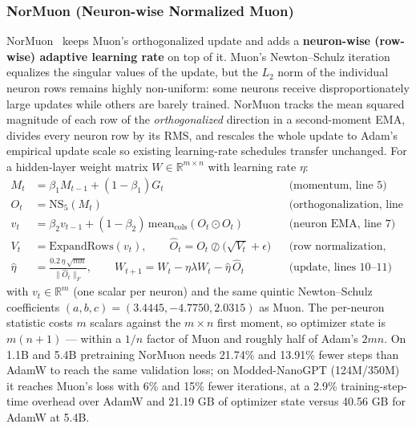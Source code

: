 \subsubsection{NorMuon (Neuron-wise Normalized Muon)}
NorMuon~\citep{li_normuon_2025} keeps Muon's orthogonalized update and adds a
\textbf{neuron-wise (row-wise) adaptive learning rate} on top of it. Muon's
Newton--Schulz iteration equalizes the singular values of the update, but the $L_2$ norm
of the individual neuron rows remains highly non-uniform: some neurons receive
disproportionately large updates while others are barely trained. NorMuon tracks the
mean squared magnitude of each row of the \emph{orthogonalized} direction in a
second-moment EMA, divides every neuron row by its RMS, and rescales the whole update to
Adam's empirical update scale so existing learning-rate schedules transfer unchanged.
For a hidden-layer weight matrix $W \in \mathbb{R}^{m \times n}$ with learning rate
$\eta$:
\begin{align}
M_t &= \beta_1 M_{t-1} + (1-\beta_1) G_t && \text{(momentum, line 5)} \\
O_t &= \mathrm{NS}_5(M_t) && \text{(orthogonalization, line 6)} \\
v_t &= \beta_2 v_{t-1} + (1-\beta_2)\,\mathrm{mean}_{\mathrm{cols}}(O_t \odot O_t) && \text{(neuron EMA, line 7)} \\
V_t &= \mathrm{ExpandRows}(v_t), \qquad \widehat{O}_t = O_t \oslash \big(\sqrt{V_t} + \epsilon\big) && \text{(row normalization, lines 8--9)} \\
\hat\eta &= \frac{0.2\,\eta\,\sqrt{mn}}{\lVert \widehat{O}_t \rVert_F}, \qquad
W_{t+1} = W_t - \eta\lambda W_t - \hat\eta\,\widehat{O}_t && \text{(update, lines 10--11)}
\end{align}
with $v_t \in \mathbb{R}^m$ (one scalar per neuron) and the same quintic Newton--Schulz
coefficients $(a,b,c)=(3.4445,-4.7750,2.0315)$ as Muon. The per-neuron statistic costs
$m$ scalars against the $m \times n$ first moment, so optimizer state is $m(n+1)$ ---
within a $1/n$ factor of Muon and roughly half of Adam's $2mn$. On 1.1B and 5.4B
pretraining NorMuon needs 21.74\% and 13.91\% fewer steps than AdamW to reach the same
validation loss; on Modded-NanoGPT (124M/350M) it reaches Muon's loss with 6\% and 15\%
fewer iterations, at a 2.9\% training-step-time overhead over AdamW and 21.19 GB of
optimizer state versus 40.56 GB for AdamW at 5.4B.

